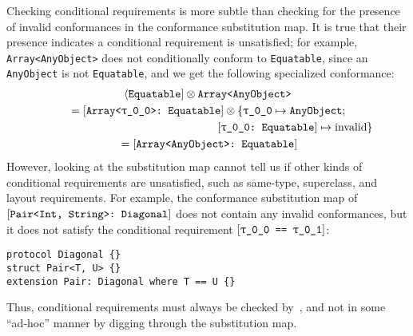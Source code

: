 \documentclass[../generics]{subfiles}
\begin{document}
Checking conditional requirements is more subtle than checking for the presence of invalid conformances in the conformance substitution map. It is true that their presence indicates a conditional requirement is unsatisfied; for example, \texttt{Array<AnyObject>} does not conditionally conform to \texttt{Equatable}, since an \texttt{AnyObject} is not \texttt{Equatable}, and we get the following specialized conformance:
\begin{gather*} %
\Proto{Equatable} \otimes \texttt{Array<AnyObject>}\\
{} = \ConfReq{Array<\rT>}{Equatable} \otimes \SubstMapC{\SubstType{\rT}{AnyObject}}{\\
\phantom{{} = \ConfReq{Array<\rT>}{Equatable} \otimes \{} \ConfReq{\rT}{Equatable}\mapsto\text{invalid}}\\
{} = \ConfReq{Array<AnyObject>}{Equatable}
\end{gather*}
However, looking at the substitution map cannot tell us  if other kinds of conditional requirements are unsatisfied, such as same-type, superclass, and layout requirements. For example, the conformance substitution map of $[\texttt{Pair<Int, String>:~Diagonal}]$ does not contain any invalid conformances, but it does not satisfy the conditional requirement $\SameReq{\rT}{\rU}$:
\begin{Verbatim}
protocol Diagonal {}
struct Pair<T, U> {}
extension Pair: Diagonal where T == U {}
\end{Verbatim}
Thus, conditional requirements must always be checked by~, and not in some ``ad-hoc'' manner by digging through the substitution map.
\end{document}
